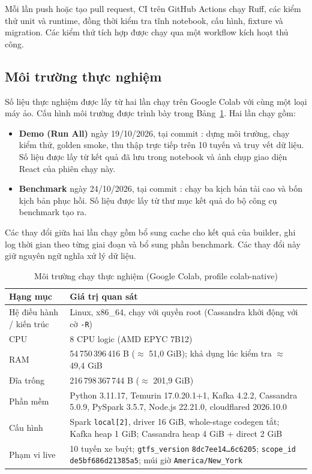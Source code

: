 Mỗi lần push hoặc tạo pull request, CI trên GitHub Actions chạy Ruff, các kiểm thử unit và runtime, đồng thời kiểm tra tĩnh notebook, cấu hình, fixture và migration. Các kiểm thử tích hợp được chạy qua một workflow kích hoạt thủ công.

\subsection{Môi trường thực nghiệm}

Số liệu thực nghiệm được lấy từ hai lần chạy trên Google Colab với cùng một loại máy ảo. Cấu hình môi trường được trình bày trong Bảng~\ref{tab:env}. Hai lần chạy gồm:
\begin{itemize}
    \item \textbf{Demo (Run All)} ngày 19/10/2026, tại commit : dựng môi trường, chạy kiểm thử, golden smoke, thu thập trực tiếp trên 10 tuyến và truy vết dữ liệu. Số liệu được lấy từ kết quả đã lưu trong notebook  và ảnh chụp giao diện React của phiên chạy này.
    \item \textbf{Benchmark} ngày 24/10/2026, tại commit : chạy ba kịch bản tải cao và bốn kịch bản phục hồi. Số liệu được lấy từ thư mục kết quả  do bộ công cụ benchmark tạo ra.
\end{itemize}
Các thay đổi giữa hai lần chạy gồm bổ sung cache  cho kết quả của builder, ghi log thời gian theo từng giai đoạn và bổ sung phần benchmark. Các thay đổi này giữ nguyên ngữ nghĩa xử lý dữ liệu.

\begin{table}[H]
\centering
\tablefont
\caption{Môi trường chạy thực nghiệm (Google Colab, profile colab-native)}
\label{tab:env}
\begin{tabular}{p{4.20cm}p{11.40cm}}
\toprule
\textbf{Hạng mục} & \textbf{Giá trị quan sát} \\
\midrule
Hệ điều hành / kiến trúc & Linux, x86\_64, chạy với quyền root (Cassandra khởi động với cờ \texttt{-R}) \\
CPU & 8 CPU logic (AMD EPYC 7B12) \\
RAM & 54\,750\,396\,416 B ($\approx$ 51,0 GiB); khả dụng lúc kiểm tra $\approx$ 49,4 GiB \\
Đĩa trống & 216\,798\,367\,744 B ($\approx$ 201,9 GiB) \\
Phần mềm & Python 3.11.17, Temurin 17.0.20.1+1, Kafka 4.2.2, Cassandra 5.0.9, PySpark 3.5.7, Node.js 22.21.0, cloudflared 2026.10.0 \\
Cấu hình & Spark \texttt{local[2]}, driver 16 GiB, whole-stage codegen tắt; Kafka heap 1 GiB; Cassandra heap 4 GiB + direct 2 GiB \\
Phạm vi live & 10 tuyến xe buýt; \texttt{gtfs\_version} \texttt{8dc7ee14\ldots6c6205}; \texttt{scope\_id} \texttt{de5bf686d21385a5}; múi giờ \texttt{America/New\_York} \\
\bottomrule
\end{tabular}
\end{table}

